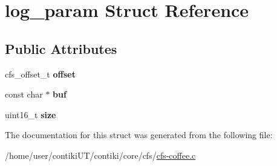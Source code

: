 \hypertarget{structlog__param}{}\section{log\+\_\+param Struct Reference}
\label{structlog__param}
\subsection*{Public Attributes}
\begin{DoxyCompactItemize}
\item 
\hypertarget{structlog__param_a53a06cbc031435d0da775d5147a8daf1}{}cfs\+\_\+offset\+\_\+t {\bfseries offset}\label{structlog__param_a53a06cbc031435d0da775d5147a8daf1}

\item 
\hypertarget{structlog__param_a3ce109f454644ad5d2cf676c906daa03}{}const char $\ast$ {\bfseries buf}\label{structlog__param_a3ce109f454644ad5d2cf676c906daa03}

\item 
\hypertarget{structlog__param_a8f5bd26cb1e82f1d4dc2acdfe04c3873}{}uint16\+\_\+t {\bfseries size}\label{structlog__param_a8f5bd26cb1e82f1d4dc2acdfe04c3873}

\end{DoxyCompactItemize}


The documentation for this struct was generated from the following file\+:\begin{DoxyCompactItemize}
\item 
/home/user/contiki\+U\+T/contiki/core/cfs/\hyperlink{cfs-coffee_8c}{cfs-\/coffee.\+c}\end{DoxyCompactItemize}
